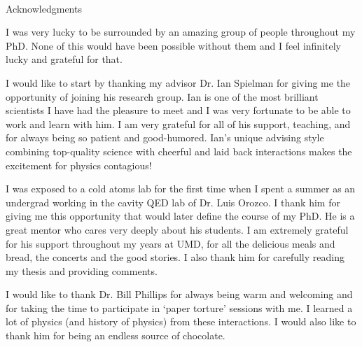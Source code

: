 
\renewcommand{\baselinestretch}{2}
\small\normalsize
\hbox{\ }
 
\vspace{-.65in}

\begin{center}
\large{Acknowledgments} 
\end{center} 

\vspace{1ex}

I was very lucky to be surrounded by an amazing group of people throughout my PhD. None of this would have been possible without them and I feel infinitely lucky and grateful for that. 

I would like to start by thanking my advisor Dr. Ian Spielman for giving me the opportunity of joining his research group. Ian is one of the most brilliant scientists I have had the pleasure to meet and I was very fortunate to be able to work and learn with him. I am very grateful for all of his support, teaching, and for always being so patient and good-humored. Ian's unique advising style combining top-quality science with cheerful and laid back interactions makes the excitement for physics contagious!

I was exposed to a cold atoms lab for the first time when I spent a summer as an undergrad working in the cavity QED lab of Dr. Luis Orozco. I thank him for giving me this opportunity that would later define the course of my PhD. He is a great mentor who cares very deeply about his students. I am extremely grateful for his support throughout my years at UMD, for all the delicious meals and bread, the concerts and the good stories. I also thank him for carefully reading my thesis and providing comments. 

I would like to thank Dr. Bill Phillips for always being warm and welcoming and for taking the time to participate in `paper torture' sessions with me. I learned a lot of physics (and history of physics) from these interactions. I would also like to thank him for being an endless source of chocolate. 

